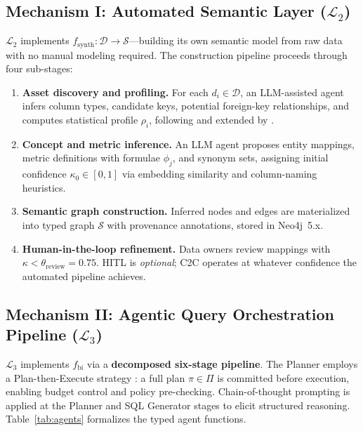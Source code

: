 \documentclass[11pt,a4paper]{article}
\begin{document}
\subsection{Mechanism I: Automated Semantic Layer ($\mathcal{L}_2$)}\label{sec:mechanism1}

$\mathcal{L}_2$ implements $f_\mathrm{synth} : \mathcal{D} \to \mathcal{S}$---building its
own semantic model from raw data with no manual modeling required.
The construction pipeline proceeds through four sub-stages:

\begin{enumerate}[noitemsep,leftmargin=1.5em]
  \item \textbf{Asset discovery and profiling.} For each $d_i \in \mathcal{D}$, an
        LLM-assisted agent infers column types, candidate keys, potential foreign-key
        relationships, and computes statistical profile $\rho_i$, following
        \citet{singh2025llm} and extended by \citet{gungor2025schemora}.
  \item \textbf{Concept and metric inference.}  An LLM agent proposes entity
        mappings, metric definitions with formulae $\phi_j$, and synonym sets,
        assigning initial confidence $\kappa_0 \in [0,1]$ via embedding similarity
        and column-naming heuristics.
  \item \textbf{Semantic graph construction.}  Inferred nodes and edges are
        materialized into typed graph $\mathcal{S}$ with provenance annotations,
        stored in Neo4j~5.x.
  \item \textbf{Human-in-the-loop refinement.}  Data owners review mappings with
        $\kappa < \theta_\mathrm{review} = 0.75$.  HITL is \emph{optional}; C2C
        operates at whatever confidence the automated pipeline achieves.
\end{enumerate}

\subsection{Mechanism II: Agentic Query Orchestration Pipeline ($\mathcal{L}_3$)}\label{sec:mechanism2}

$\mathcal{L}_3$ implements $f_\mathrm{bi}$ via a \textbf{decomposed six-stage
pipeline}.  The Planner employs a Plan-then-Execute strategy
\citep{delrosario2025plan}: a full plan $\pi \in \Pi$ is committed before
execution, enabling budget control and policy pre-checking.  Chain-of-thought
prompting \citep{wei2022cot} is applied at the Planner and SQL Generator stages
to elicit structured reasoning.  Table~\ref{tab:agents} formalizes the typed
agent functions.
\end{document}
